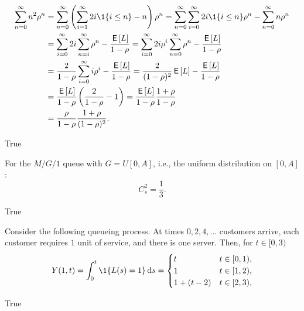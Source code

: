 \begin{exercise}[201703]
\begin{equation*}
  \begin{split}
    \sum_{n=0}^\infty n^2 \rho^n 
&=    \sum_{n=0}^\infty \left(\sum_{i=1}^\infty 2i \1{i\leq n}  - n\right)\rho^n 
=    \sum_{n=0}^\infty \sum_{i=0}^\infty 2i\1{i\leq n}\rho^n  - \sum_{n=0}^\infty n\rho^n \\
&=    \sum_{i=0}^\infty 2i \sum_{n=i}^\infty \rho^n  - \frac{\E L}{1-\rho} 
=    \sum_{i=0}^\infty 2i \rho^i \sum_{n=0}^\infty \rho^n  - \frac{\E L}{1-\rho} \\
&=    \frac2{1-\rho} \sum_{i=0}^\infty i \rho^i   - \frac{\E L}{1-\rho} 
=    \frac2{(1-\rho)^2} \E L - \frac{\E L}{1-\rho} \\
&=    \frac{\E L}{1-\rho}  \left(\frac2{1-\rho}  - 1\right) 
=    \frac{\E L}{1-\rho}  \frac{1+\rho}{1-\rho} \\
&=    \frac{\rho}{1-\rho}  \frac{1+\rho}{(1-\rho)^2}.
\end{split}
\end{equation*}

\begin{solution}
    True
\end{solution}
\end{exercise}

\begin{exercise}[201703]
  For the $M/G/1$ queue with $G=U[0,A]$, i.e., the uniform
  distribution on $[0,A]$: 
  \begin{equation*}
C_s^2 = \frac 13.
  \end{equation*}

\begin{solution}
    True
\end{solution}
\end{exercise}

\begin{exercise}[201704]%
  Consider the following queueing process. At times
  $0, 2,4, \ldots$ customers arrive, each customer requires $1$ unit
  of service, and there is one server.  Then, for $t\in[0,3)$
    \begin{equation*}
      Y(1,t) = \int_0^t \1{L(s) = 1}\d s = 
      \begin{cases}
        t & t\in[0,1), \\
        1 & t\in[1,2), \\
        1+(t-2) & t\in[2,3), \\
      \end{cases}
    \end{equation*}
\begin{solution} True
\end{solution}
\end{exercise}

